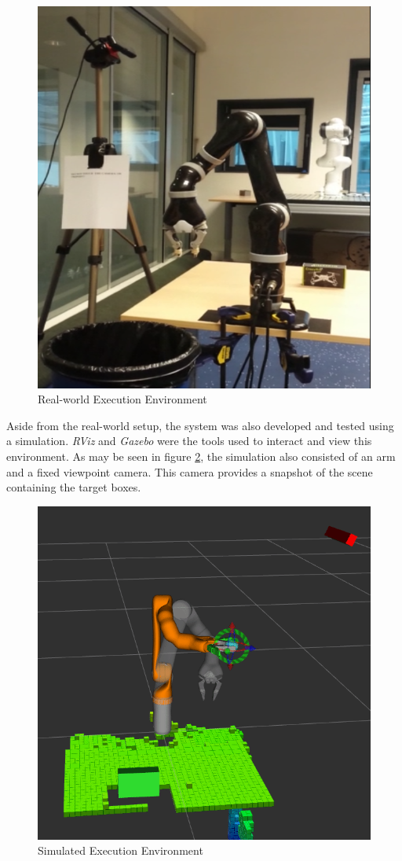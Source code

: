 \documentclass[letterpaper, 10 pt, conference]{conf/ieeeconf}  %
\begin{document}
\begin{figure}[ht]
  \centering
  \includegraphics[width=0.8\linewidth]{real_environment.png}
  \caption{\label{fig:real_environment} Real-world Execution Environment}
\end{figure}

Aside from the real-world setup, the system was also developed and tested using
a simulation. \textit{RViz} and \textit{Gazebo} were the tools used to interact
and view this environment. As may be seen in figure
\ref{fig:virtual_environment}, the simulation also consisted of an arm and a
fixed viewpoint camera. This camera provides a snapshot of the scene containing
the target boxes.

\begin{figure}[ht]
  \centering
  \includegraphics[width=0.8\linewidth]{virtual_environment.png}
  \caption{\label{fig:virtual_environment} Simulated Execution Environment}
\end{figure}
\end{document}
